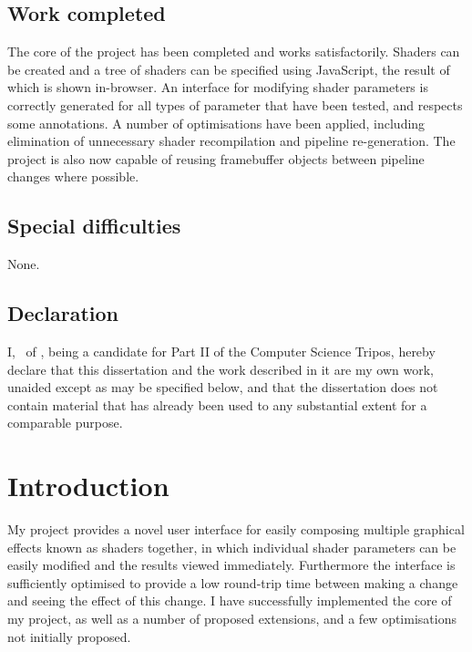 \documentclass[12pt,twoside,notitlepage]{report}
\begin{document}
\section*{Work completed}
The core of the project has been completed and works satisfactorily. Shaders can be created and a tree of shaders can be specified using JavaScript, the result of which is shown in-browser. An interface for modifying shader parameters is correctly generated for all types of parameter that have been tested, and respects some annotations. A number of optimisations have been applied, including elimination of unnecessary shader recompilation and pipeline re-generation. The project is also now capable of reusing framebuffer objects between pipeline changes where possible.

\section*{Special difficulties}
None.
 
\newpage
\section*{Declaration}

I, \name \ of \college, being a candidate for Part II of the Computer
Science Tripos, hereby declare
that this dissertation and the work described in it are my own work,
unaided except as may be specified below, and that the dissertation
does not contain material that has already been used to any substantial
extent for a comparable purpose.

\bigskip
{}

\medskip
{}

\cleardoublepage

\tableofcontents


\cleardoublepage        %


\chapter{Introduction}
My project provides a novel user interface for easily composing multiple graphical effects known as shaders together, in which individual shader parameters can be easily modified and the results viewed immediately. Furthermore the interface is sufficiently optimised to provide a low round-trip time between making a change and seeing the effect of this change. I have successfully implemented the core of my project, as well as a number of proposed extensions, and a few optimisations not initially proposed.
\end{document}
